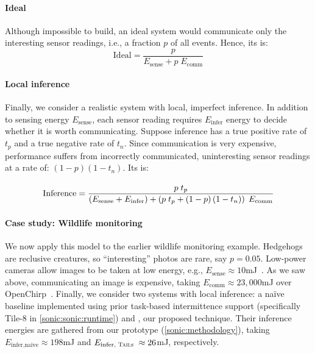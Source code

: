 \tabSONICMotivateModel

\paragraph{Ideal}
%
Although impossible to build, an ideal system would communicate only
the interesting sensor readings, i.e., a fraction $p$ of all events.
%
Hence, its \metric is:
\begin{equation}
  \text{Ideal}
  = \frac{p}{E_\text{sense} + p \; E_\text{comm}}
\end{equation}

\paragraph{Local inference}
%
Finally, we consider a realistic system with local, imperfect inference.
%
In addition to sensing energy $E_\text{sense}$,
each sensor reading requires $E_\text{infer}$ energy to decide whether it is worth communicating.
%
Suppose inference has a true positive rate
of $t_p$ and a true negative rate
of $t_n$.
%
Since communication is very expensive, performance
suffers from incorrectly communicated,
uninteresting sensor readings at a rate of: $\left(1-p\right)\left(1-t_n\right) $.
%
Its \metric is:
\vspace{-1em}
\begin{align}
  \label{eq:impj}
  & \\[-0.85em]
  \text{Inference}
  &= \frac{p \; t_p}{\left(E_\text{sense} + E_\text{infer}\right) + \left(p \; t_p + \left(1-p\right)\left(1-t_n\right)\right) \; E_\text{comm}} \notag
\end{align}

\paragraph{Case study: Wildlife monitoring}
%
We now apply this model to the earlier wildlife monitoring example.
%
Hedgehogs are reclusive creatures, so ``interesting'' photos are rare,
say $p = 0.05$.
%
Low-power cameras allow images to be taken at low energy, e.g.,
$E_\text{sense} \approx 10$mJ~\cite{wispcam}.
%
As we saw above, communicating an image is expensive, taking
$E_\text{comm} \approx 23,\!000$mJ over OpenChirp~\cite{dongare2017openchirp}.
%
Finally, we consider two systems with local inference:
a na\"ive baseline implemented using prior task-based intermittence support (specifically Tile-8 in \autoref{sonic:sonic:runtime})
and \sonictails, our proposed technique.
Their inference energies are gathered from our prototype (\autoref{sonic:methodology}),
taking $E_\text{infer,na\"ive} \approx 198$mJ and $E_\text{infer,\tails} \approx 26$mJ, respectively.

